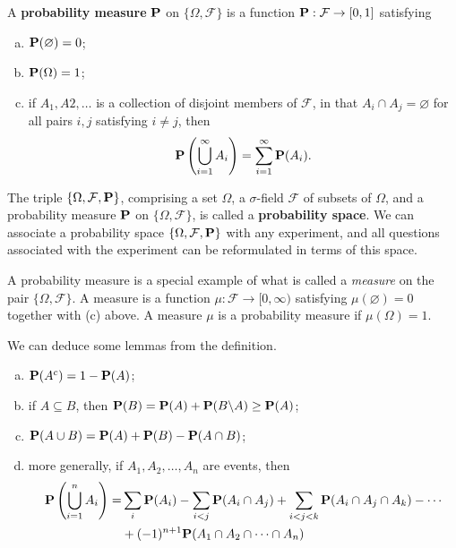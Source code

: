 \begin{definition}
A \textbf{probability measure} $\mathbf{P}$ on $\{ \Omega, \mathcal{F} \}$ is a function $\mathbf{P} : \mathcal{F} \to [0,1]$ satisfying
\begin{enumerate}[(a)]
    \item $\mathbf{P}(\varnothing) = 0$;
    \item $\mathbf{P}(\Omega) = 1$;
    \item  if $A_1, A2, \dots$ is a collection of disjoint members of $\mathcal{F}$, in that $A_i \cap A_j = \varnothing$ for all pairs $i, j$ satisfying $i \neq j$, then
    \begin{equation*}
        \mathbf{P}\left( \bigcup_{i=1}^\infty A_i \right) = \sum_{i=1}^\infty \mathbf{P} (A_i).
    \end{equation*}
\end{enumerate}
\end{definition}
The triple $\{ \Omega, \mathcal{F}, \mathbf{P} \}$, comprising a set $\Omega$, a $\sigma$-field $\mathcal{F}$ of subsets of $\Omega$, and a probability measure $\mathbf{P}$ on $\{\Omega, \mathcal{F}\}$, is called a \textbf{probability space}. We can associate a probability space $\{ \Omega, \mathcal{F}, \mathbf{P} \}$ with any experiment, and all questions associated with the experiment can be reformulated in terms of this space. 

\begin{remark}
A probability measure is a special example of what is called a \emph{measure} on the pair $\{\Omega, \mathcal{F}\}$. A measure is a function $\mu: \mathcal{F} \to [0, \infty)$ satisfying $\mu(\varnothing) = 0$ together with (c) above. A measure $\mu$ is a probability measure if $\mu(\Omega) = 1$. 
\end{remark}

\begin{lemma}
We can deduce some lemmas from the definition.
\begin{enumerate}[(a)]
    \item $\mathbf{P}(A^c) = 1 - \mathbf{P}(A)$;
    \item if $A \subseteq B$, then $\mathbf{P}(B) = \mathbf{P}(A) + \mathbf{P}(B\backslash A) \geq \mathbf{P}(A)$;
    \item $\mathbf{P}(A \cup B) = \mathbf{P}(A) + \mathbf{P}(B) - \mathbf{P}(A \cap B)$;
    \item more generally, if $A_1, A_2, \dots, A_n$ are events, then 
    \begin{equation*}
        \begin{split}
        \mathbf{P}\left( \bigcup_{i=1}^n A_i \right) =& \sum_{i}\mathbf{P}(A_i) - \sum_{i < j} \mathbf{P}(A_i \cap A_j) + \sum_{i<j<k} \mathbf{P}(A_i \cap A_j \cap A_k) - \cdots \\
        & +(-1)^{n+1} \mathbf{P}(A_1 \cap A_2 \cap \cdots \cap A_n)
        \end{split}
    \end{equation*}
\end{enumerate}
\end{lemma}

